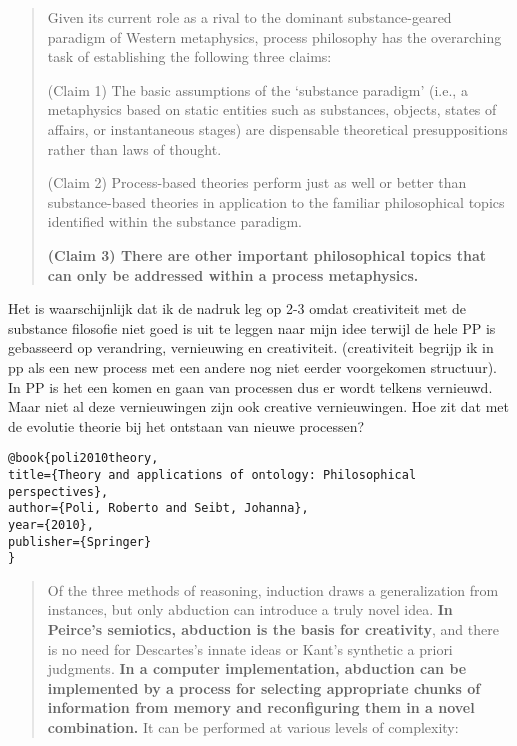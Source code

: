 \documentclass[a4paper]{Thesis}
\begin{document}
\begin{quotation}
	Given its current role as a rival to the dominant substance-geared paradigm of Western metaphysics, process philosophy has the overarching task of establishing the following three claims:
	
	(Claim 1) The basic assumptions of the ‘substance paradigm’ (i.e., a metaphysics based on static entities such as substances, objects, states of affairs, or instantaneous stages) are dispensable theoretical presuppositions rather than laws of thought.
	
	(Claim 2) Process-based theories perform just as well or better than substance-based theories in application to the familiar philosophical topics identified within the substance paradigm.
	
	\textbf{(Claim 3) There are other important philosophical topics that can only be addressed within a process metaphysics.}
\end{quotation}
Het is waarschijnlijk dat ik de nadruk leg op 2-3 omdat creativiteit met de substance filosofie niet goed is uit te leggen naar mijn idee terwijl de hele PP is gebasseerd op verandring, vernieuwing en creativiteit.
(creativiteit begrijp ik in pp als een new process met een andere nog niet eerder voorgekomen structuur). In PP is het een komen en gaan van processen dus er wordt telkens vernieuwd. Maar niet al deze vernieuwingen zijn ook creative vernieuwingen.
Hoe zit dat met de evolutie theorie bij het ontstaan van nieuwe processen?





\begin{verbatim}
@book{poli2010theory,
title={Theory and applications of ontology: Philosophical perspectives},
author={Poli, Roberto and Seibt, Johanna},
year={2010},
publisher={Springer}
}
\end{verbatim}
\begin{quotation}
	Of the three methods of reasoning, induction draws a generalization from
	instances, but only abduction can introduce a truly novel idea. 
	\textbf{In Peirce’s semiotics,
		abduction is the basis for creativity}, and there is no need for Descartes’s innate ideas
	or Kant’s synthetic a priori judgments. \textbf{In a computer implementation, abduction
		can be implemented by a process for selecting appropriate chunks of information
		from memory and reconfiguring them in a novel combination.} It can be performed
	at various levels of complexity:
\end{quotation}
\end{document}
